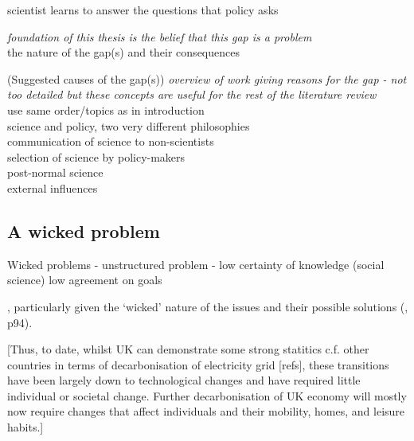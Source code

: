 scientist learns to answer the questions that policy asks \cite{Gerber2023}

\emph{foundation of this thesis is the belief that this gap is a problem} \\
the nature of the gap(s) and their consequences

(Suggested causes of the gap(s))
\emph{overview of work giving reasons for the gap - not too detailed but these concepts are useful for the rest of the literature review} \\
use same order/topics as in introduction\\
science and policy, two very different philosophies\\
communication of science to non-scientists\\
selection of science by policy-makers\\
post-normal science\\
external influences

\subsection{A wicked problem}
Wicked problems \cite{RittelW1973}
\cite{WesselinkH2020} - unstructured problem - low certainty of knowledge (social science) low agreement on goals

, particularly given the `wicked' nature of the issues and their possible solutions (\cite{Cairney2016}, p94). 

[Thus, to date, whilst UK can demonstrate some strong statitics c.f. other countries in terms of decarbonisation of electricity grid [refs], these transitions have been largely down to technological changes and have required little individual or societal change. Further decarbonisation of UK economy will mostly now require changes that affect individuals and their mobility, homes, and leisure habits.]

